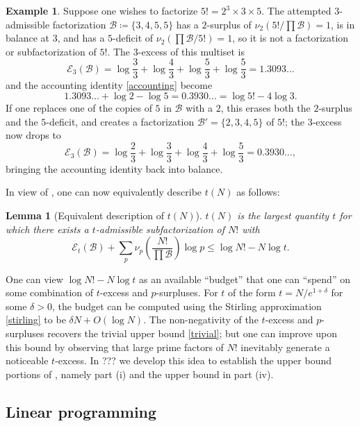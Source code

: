 \documentclass[12pt,a4paper,reqno]{amsart}
\numberwithin{equation}{section}
\theoremstyle{plain}
\newtheorem{lemma}[theorem]{Lemma}
\theoremstyle{definition}
\newtheorem{example}[theorem]{Example}
\newcommand\tuple{{\mathcal B}}
\newcommand\excess{{\mathcal{E}}}
\begin{document}
\begin{example} Suppose one wishes to factorize $5! = 2^3 \times 3 \times 5$.  The attempted $3$-admissible factorization $\tuple \coloneqq \{3,4,5,5\}$ has a $2$-surplus of $\nu_2(5!/\prod \tuple) = 1$, is in balance at $3$, and has a $5$-deficit of $\nu_2(\prod \tuple/5!) = 1$, so it is not a factorization or subfactorization of $5!$.  The $3$-excess of this multiset is
  $$ \excess_3(\tuple) = \log \frac{3}{3} + \log \frac{4}{3} + \log \frac{5}{3} + \log \frac{5}{3} = 1.3093\dots$$
  and the accounting identity \eqref{accounting} become
  $$ 1.3093\dots + \log 2 - \log 5 = 0.3930\dots = \log 5! - 4 \log 3.$$
  If one replaces one of the copies of $5$ in ${\mathcal B}$ with a $2$, this erases both the $2$-surplus and the $5$-deficit, and creates a factorization $\tuple' = \{2,3,4,5\}$ of $5!$; the $3$-excess now drops to
  $$ \excess_3(\tuple) = \log \frac{2}{3} + \log \frac{3}{3} + \log \frac{4}{3} + \log \frac{5}{3}  = 0.3930\dots,$$
  bringing the accounting identity back into balance.
\end{example}
  
In view of , one can now equivalently describe 
$t(N)$ as follows:

\begin{lemma}[Equivalent description of $t(N)$]\label{t-descrip}  $t(N)$ is the largest quantity $t$ for which there exists a $t$-admissible subfactorization of $N!$ with
$$ \excess_t(\tuple) + \sum_p \nu_p\left( \frac{N!}{\prod \tuple} \right) \log p \leq \log N! - N \log t.$$
\end{lemma}

One can view $\log N! - N\log t$ as an available ``budget'' that one can ``spend'' on some combination of $t$-excess and $p$-surpluses.  For $t$ of the form $t = N/e^{1+\delta}$ for some $\delta>0$, the budget can be computed using the Stirling approximation \eqref{stirling} to be $\delta N + O(\log N)$.  The non-negativity of the $t$-excess and $p$-surpluses recovers the trivial upper bound \eqref{trivial}; but one can improve upon this bound by observing that large prime factors of $N!$ inevitably generate a noticeable $t$-excess.  In ??? we develop this idea to establish the upper bound portions of , namely part (i) and the upper bound in part (iv).







\subsection{Linear programming}
\end{document}
